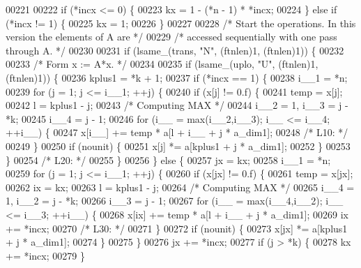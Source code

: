 \begin{DoxyCode}
00221 
00222     \textcolor{keywordflow}{if} (*incx <= 0) \{
00223     kx = 1 - (*n - 1) * *incx;
00224     \} \textcolor{keywordflow}{else} \textcolor{keywordflow}{if} (*incx != 1) \{
00225     kx = 1;
00226     \}
00227 
00228 \textcolor{comment}{/*     Start the operations. In this version the elements of A are */}
00229 \textcolor{comment}{/*     accessed sequentially with one pass through A. */}
00230 
00231     \textcolor{keywordflow}{if} (lsame\_(trans, \textcolor{stringliteral}{"N"}, (ftnlen)1, (ftnlen)1)) \{
00232 
00233 \textcolor{comment}{/*         Form  x := A*x. */}
00234 
00235     \textcolor{keywordflow}{if} (lsame\_(uplo, \textcolor{stringliteral}{"U"}, (ftnlen)1, (ftnlen)1)) \{
00236         kplus1 = *k + 1;
00237         \textcolor{keywordflow}{if} (*incx == 1) \{
00238         i\_\_1 = *n;
00239         \textcolor{keywordflow}{for} (j = 1; j <= i\_\_1; ++j) \{
00240             \textcolor{keywordflow}{if} (x[j] != 0.f) \{
00241             temp = x[j];
00242             l = kplus1 - j;
00243 \textcolor{comment}{/* Computing MAX */}
00244             i\_\_2 = 1, i\_\_3 = j - *k;
00245             i\_\_4 = j - 1;
00246             \textcolor{keywordflow}{for} (i\_\_ = max(i\_\_2,i\_\_3); i\_\_ <= i\_\_4; ++i\_\_) \{
00247                 x[i\_\_] += temp * a[l + i\_\_ + j * a\_dim1];
00248 \textcolor{comment}{/* L10: */}
00249             \}
00250             \textcolor{keywordflow}{if} (nounit) \{
00251                 x[j] *= a[kplus1 + j * a\_dim1];
00252             \}
00253             \}
00254 \textcolor{comment}{/* L20: */}
00255         \}
00256         \} \textcolor{keywordflow}{else} \{
00257         jx = kx;
00258         i\_\_1 = *n;
00259         \textcolor{keywordflow}{for} (j = 1; j <= i\_\_1; ++j) \{
00260             \textcolor{keywordflow}{if} (x[jx] != 0.f) \{
00261             temp = x[jx];
00262             ix = kx;
00263             l = kplus1 - j;
00264 \textcolor{comment}{/* Computing MAX */}
00265             i\_\_4 = 1, i\_\_2 = j - *k;
00266             i\_\_3 = j - 1;
00267             \textcolor{keywordflow}{for} (i\_\_ = max(i\_\_4,i\_\_2); i\_\_ <= i\_\_3; ++i\_\_) \{
00268                 x[ix] += temp * a[l + i\_\_ + j * a\_dim1];
00269                 ix += *incx;
00270 \textcolor{comment}{/* L30: */}
00271             \}
00272             \textcolor{keywordflow}{if} (nounit) \{
00273                 x[jx] *= a[kplus1 + j * a\_dim1];
00274             \}
00275             \}
00276             jx += *incx;
00277             \textcolor{keywordflow}{if} (j > *k) \{
00278             kx += *incx;
00279             \}

\end{DoxyCode}
